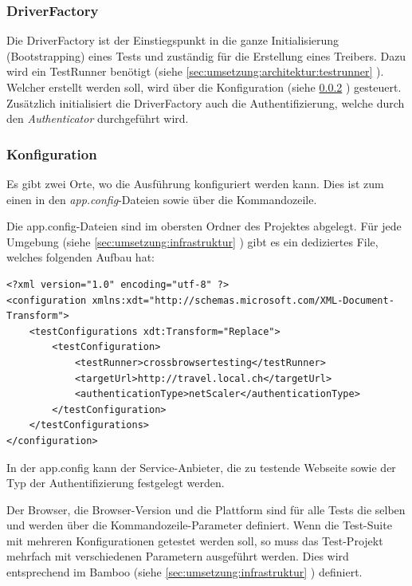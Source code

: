 \subsubsection{DriverFactory}
\label{sec:umsetzung:Architektur:DriverFactory}
Die DriverFactory ist der Einstiegspunkt in die ganze Initialisierung (Bootstrapping) eines Tests und zuständig für die Erstellung eines Treibers. Dazu wird ein TestRunner benötigt (siehe \cref{sec:umsetzung:architektur:testrunner} ). Welcher erstellt werden soll, wird über die Konfiguration (siehe \cref{sec:umsetzung:architektur:bootstrap:konfiguration} ) gesteuert. Zusätzlich initialisiert die DriverFactory auch die Authentifizierung, welche durch den \textit{Authenticator} durchgeführt wird.

\subsubsection{Konfiguration}
\label{sec:umsetzung:architektur:bootstrap:konfiguration}
Es gibt zwei Orte, wo die Ausführung konfiguriert werden kann. Dies ist zum einen in den \textit{app.config}-Dateien sowie über die Kommandozeile.

Die app.config-Dateien sind im obersten Ordner des Projektes abgelegt. Für jede Umgebung (siehe \cref{sec:umsetzung:infrastruktur} ) gibt es ein dediziertes File, welches folgenden Aufbau hat:

\lstset{language=xml}
\begin{lstlisting}
<?xml version="1.0" encoding="utf-8" ?>
<configuration xmlns:xdt="http://schemas.microsoft.com/XML-Document-Transform">
	<testConfigurations xdt:Transform="Replace">
		<testConfiguration>
			<testRunner>crossbrowsertesting</testRunner>
			<targetUrl>http://travel.local.ch</targetUrl>
			<authenticationType>netScaler</authenticationType>
		</testConfiguration>
	</testConfigurations>
</configuration>
\end{lstlisting}

In der app.config kann der Service-Anbieter, die zu testende Webseite sowie der Typ der Authentifizierung festgelegt werden.

Der Browser, die Browser-Version und die Plattform sind für alle Tests die selben und werden über die Kommandozeile-Parameter definiert. Wenn die Test-Suite mit mehreren Konfigurationen getestet werden soll, so muss das Test-Projekt mehrfach mit verschiedenen Parametern ausgeführt werden. Dies wird entsprechend im Bamboo (siehe \cref{sec:umsetzung:infrastruktur} ) definiert.

